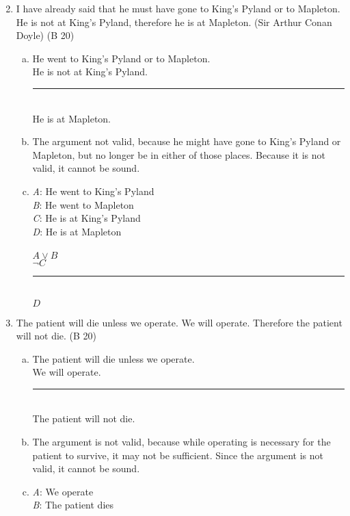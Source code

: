 \documentclass{article}
\begin{document}
\begin{enumerate}
      \setcounter{enumi}{1}
      \item I have already said that he must have gone to King's Pyland or to Mapleton. He is not at King's Pyland, therefore he is at Mapleton. (Sir Arthur Conan Doyle) (B 20)
            \begin{enumerate}[(a)]
                  \item He went to King's Pyland or to Mapleton.\\
                        He is not at King's Pyland.\\
                        \rule{15em}{.5pt}\\
                        He is at Mapleton.
                  \item The argument not valid, because he might have gone to King's Pyland or Mapleton, but no longer be in either of those places. Because it is not valid, it cannot be sound.
                  \item \textit{A}: He went to King's Pyland\\
                        \textit{B}: He went to Mapleton\\
                        \textit{C}: He is at King's Pyland\\
                        \textit{D}: He is at Mapleton\\\\
                        $A \lor B$\\
                        $\neg C$\\
                        \rule{5em}{.5pt}\\
                        $D$
            \end{enumerate}
      \item The patient will die unless we operate. We will operate. Therefore the patient will not die. (B 20)
            \begin{enumerate}[(a)]
                  \item The patient will die unless we operate.\\
                        We will operate.\\
                        \rule{15em}{.5pt}\\
                        The patient will not die.
                  \item The argument is not valid, because while operating is necessary for the patient to survive, it may not be sufficient. Since the argument is not valid, it cannot be sound.
                  \item \textit{A}: We operate\\
                        \textit{B}: The patient dies\\


\end{enumerate}
\end{enumerate}
\end{document}
